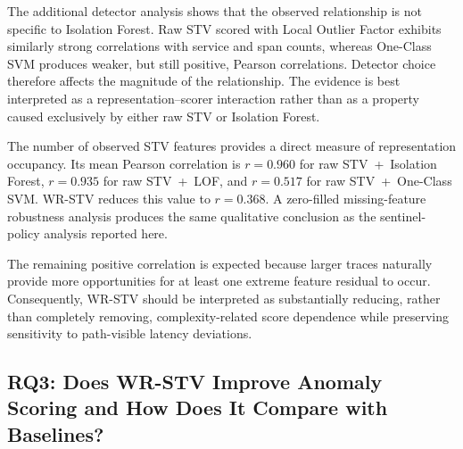 \documentclass[informatics,article,submit,moreauthors]{Definitions/mdpi}
\newcommand{\rev}[1]{{\color{revisionblue}#1}}
\begin{document}
\rev{The additional detector analysis shows that the observed relationship
is not specific to Isolation Forest. Raw STV scored with Local Outlier
Factor exhibits similarly strong correlations with service and span counts,
whereas One-Class SVM produces weaker, but still positive, Pearson
correlations. Detector choice therefore affects the magnitude of the
relationship. The evidence is best interpreted as a
representation--scorer interaction rather than as a property caused
exclusively by either raw STV or Isolation Forest.}

\rev{The number of observed STV features provides a direct measure of
representation occupancy. Its mean Pearson correlation is \(r=0.960\) for
raw STV~+~Isolation Forest, \(r=0.935\) for raw STV~+~LOF, and \(r=0.517\)
for raw STV~+~One-Class SVM. WR-STV reduces this value to \(r=0.368\).
A zero-filled missing-feature robustness analysis produces the same
qualitative conclusion as the sentinel-policy analysis reported here.}

The remaining positive correlation is expected because larger traces
naturally provide more opportunities for at least one extreme feature
residual to occur. Consequently, WR-STV should be interpreted as
substantially reducing, rather than completely removing,
\rev{complexity-related score dependence} while preserving sensitivity
to path-visible latency deviations.

\subsection{RQ3: Does WR-STV Improve Anomaly Scoring and How Does It Compare with Baselines?}
\label{sec:results-main}
\end{document}

